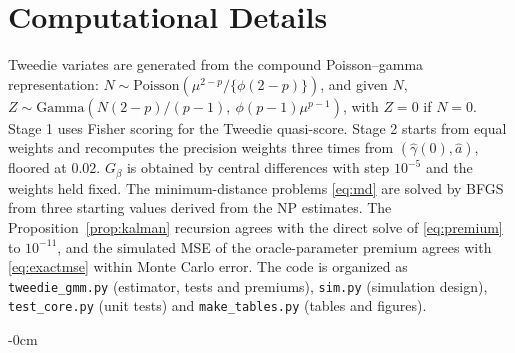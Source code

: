 \documentclass[mathematics,article,submit,moreauthors]{Definitions/mdpi}
\begin{document}
\section{Computational Details}\label{app:computation}

Tweedie variates are generated from the compound Poisson--gamma representation: $N\sim\mathrm{Poisson}(\mu^{2-p}/\{\phi(2-p)\})$, and given $N$, $Z\sim\mathrm{Gamma}(N(2-p)/(p-1),\ \phi(p-1)\mu^{p-1})$, with $Z=0$ if $N=0$. Stage 1 uses Fisher scoring for the Tweedie quasi-score. Stage 2 starts from equal weights and recomputes the precision weights three times from $(\hat\gamma(0),\hat a)$, floored at $0.02$. $G_\beta$ is obtained by central differences with step $10^{-5}$ and the weights held fixed. The minimum-distance problems \eqref{eq:md} are solved by BFGS from three starting values derived from the NP estimates. The Proposition~\ref{prop:kalman} recursion agrees with the direct solve of \eqref{eq:premium} to $10^{-11}$, and the simulated MSE of the oracle-parameter premium agrees with \eqref{eq:exactmse} within Monte Carlo error. The code is organized as \texttt{tweedie\_gmm.py} (estimator, tests and premiums), \texttt{sim.py} (simulation design), \texttt{test\_core.py} (unit tests) and \texttt{make\_tables.py} (tables and figures).

\begin{adjustwidth}{-\extralength}{0cm}

\PublishersNote{}
\end{adjustwidth}
\end{document}
